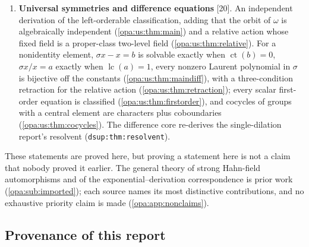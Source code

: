 \documentclass[11pt,oneside]{article}
\numberwithin{equation}{section}
\theoremstyle{definition}
\theoremstyle{remark}
\newcommand{\Oz}{\mathbf{Oz}}
\newcommand{\lc}{\operatorname{lc}}
\newcommand{\ct}{\operatorname{ct}}
\newcommand{\src}[1]{\textup{\textsf{\small[#1]}}}
\newcommand{\lbl}[1]{\nolinkurl{#1}}
\begin{document}
\begin{enumerate}[label=\textup{(\arabic*)},leftmargin=*,itemsep=3pt]
Hasse--Schmidt extension (\cref{opa:hs:thm:integration}), which answers
\cref{opa:par:q:directions}; all formal automorphisms tangent to the identity are
exponentials of integral Lie series, finite jets always lift, and the jet extensions
do not split (\cref{opa:hs:thm:lie}); the quartic formula of \cref{opa:cr:part}
becomes universal in $\Oz[[s]]$ and no set of parameters defines the coefficient copy
there (\cref{opa:hs:thm:logic}).
\item \textbf{Universal symmetries and difference equations} \src{20}. An independent
derivation of the left-orderable classification, adding that the orbit of $\omega$ is
algebraically independent (\cref{opa:us:thm:main}) and a relative action whose fixed field
is a proper-class two-level field (\cref{opa:us:thm:relative}). For a nonidentity element,
$\sigma x-x=b$ is solvable exactly when $\ct(b)=0$, $\sigma x/x=a$ exactly when $\lc(a)=1$,
every nonzero Laurent polynomial in $\sigma$ is bijective off the constants
(\cref{opa:us:thm:maindiff}), with a three-condition retraction for the relative action
(\cref{opa:us:thm:retraction}); every scalar first-order equation is classified
(\cref{opa:us:thm:firstorder}), and cocycles of groups with a central element are
characters plus coboundaries (\cref{opa:us:thm:cocycles}). The difference core re-derives
the single-dilation report's resolvent (\lbl{dsup:thm:resolvent}).
\end{enumerate}

These statements are proved here, but proving a statement here is not a claim
that nobody proved it earlier. The general theory of strong Hahn-field
automorphisms and of the exponential--derivation correspondence is prior
work (\cref{opa:sub:imported}); each source names its most distinctive
contributions, and no exhaustive priority claim is made
(\cref{opa:app:nonclaims}).

\subsection{Provenance of this report}\label{opa:sub:provenance}
\end{document}
